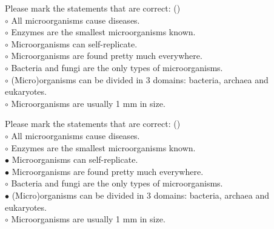 \documentclass[]{beamer}
\begin{document}
\begin{CJK}{UTF8}{gbsn}
\begin{frame}[shrink] {}
\addtocounter{questions}{1}
\color{blue}
Please mark the statements that are correct:
({})\\
\color{black}
\setlength{\parindent}{-0.4cm}
{\color{red}$\circ$} All microorganisms cause diseases.  \\
{\color{red}$\circ$} Enzymes are the smallest microorganisms known.   \\
{\color{red}$\circ$}  Microorganisms can self-replicate.  \\
{\color{red}$\circ$}  Microorganisms are found pretty much everywhere.  \\
{\color{red}$\circ$} Bacteria and fungi are the only types of microorganisms.  \\
{\color{red}$\circ$}  (Micro)organisms can be divided in 3 domains: bacteria, archaea and eukaryotes.  \\
{\color{red}$\circ$} Microorganisms are usually 1 mm in size.  \\
\end{frame}
\begin{frame}[shrink] {}
\addtocounter{answers}{1}
\color{blue}
Please mark the statements that are correct:
({})\\
\color{black}
\setlength{\parindent}{-0.4cm}
{\color{red}$\circ$} All microorganisms cause diseases.  \\
{\color{red}$\circ$} Enzymes are the smallest microorganisms known.   \\
{\color{red}$\bullet$} Microorganisms can self-replicate.  \\
{\color{red}$\bullet$} Microorganisms are found pretty much everywhere.  \\
{\color{red}$\circ$} Bacteria and fungi are the only types of microorganisms.  \\
{\color{red}$\bullet$} (Micro)organisms can be divided in 3 domains: bacteria, archaea and eukaryotes.  \\
{\color{red}$\circ$} Microorganisms are usually 1 mm in size.  \\
\end{frame}



\end{CJK}
\end{document}
